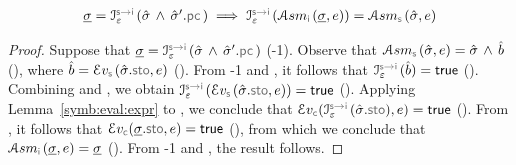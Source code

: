 \begin{lemma}
$$
\begin{array}{l}
\istate = \interpret{\symbinst}{\senv}(\sstate \, \wedge \, \sstate'.\pcsel)  
       \implies  \interpret{\symbinst}{\senv}(\absassume{\instrumented}(\istate, \jsilexpr)) = \absassume{\symbolic}(\sstate, \jsilexpr) 
\end{array}
$$
\end{lemma}
\begin{proof}
Suppose that $\istate = \interpret{\symbinst}{\senv}(\sstate \, \wedge \, \sstate'.\pcsel)$ (\hyp{1}).
Observe that $\absassume{\symbolic}(\sstate, \jsilexpr) = \sstate \, \wedge \, \sexprb$ (), where 
$\sexprb = \evalexpr{\symbolic}(\sstate.\stosel, \jsilexpr)$ (). 
From \hyp{1} and , it follows that $\interpret{\symbinst}{\senv}(\sexprb) = \jtrue$ (). 
Combining  and , we obtain $\interpret{\symbinst}{\senv}( \evalexpr{\symbolic}(\sstate.\stosel, \jsilexpr)) = \jtrue$ (). 
Applying Lemma~\ref{symb:eval:expr} to , we conclude that
$\evalexpr{\concrete}(\interpret{\symbinst}{\senv}(\sstate.\stosel), \jsilexpr) = \jtrue$ (). 
From , it follows that $\evalexpr{\concrete}(\istate.\stosel, \jsilexpr) = \jtrue$ (), 
from which we conclude that $\absassume{\instrumented}(\istate, \jsilexpr) = \istate$ (). 
From \hyp{1} and , the result follows. 
\end{proof}


